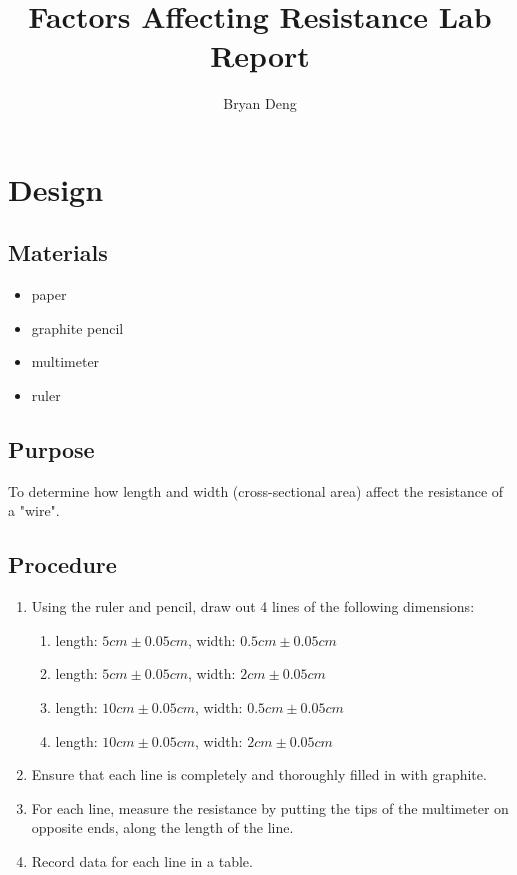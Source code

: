 \documentclass[12pt]{article}
\title{Factors Affecting Resistance Lab Report}
\author{Bryan Deng}
\begin{document}
\maketitle
\newpage
\tableofcontents
\newpage

\section{Design}

\subsection{Materials}

\begin{itemize}
    \item paper
    \item graphite pencil
    \item multimeter
    \item ruler
\end{itemize}

\subsection{Purpose}

To determine how length and width (cross-sectional area) affect the resistance of a "wire".

\subsection{Procedure}

\begin{enumerate}
    \item Using the ruler and pencil, draw out 4 lines of the following dimensions:
    \begin{enumerate}
        \item length: $5\si{cm} \pm 0.05\si{cm}$, width: $0.5\si{cm} \pm 0.05\si{cm}$
        \item length: $5\si{cm} \pm 0.05\si{cm}$, width: $2\si{cm} \pm 0.05\si{cm}$
        \item length: $10\si{cm} \pm 0.05\si{cm}$, width: $0.5\si{cm} \pm 0.05\si{cm}$
        \item length: $10\si{cm} \pm 0.05\si{cm}$, width: $2\si{cm} \pm 0.05\si{cm}$
    \end{enumerate}
    \item Ensure that each line is completely and thoroughly filled in with graphite.
    \item For each line, measure the resistance by putting the tips of the multimeter on opposite ends, along the length of the line.
    \item Record data for each line in a table.
\end{enumerate}
\end{document}

